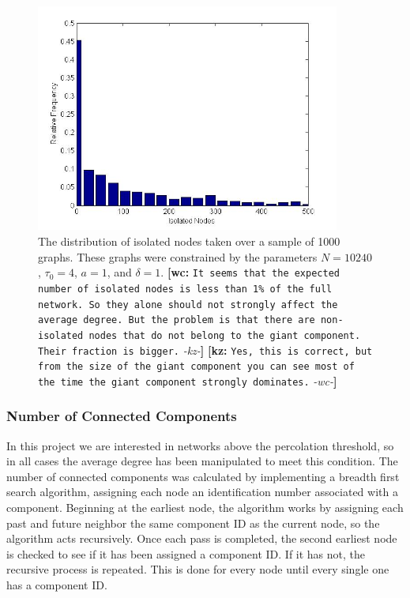 \documentclass[preprint,notitlepage,amsmath,amssymb,floatfix]{revtex4-1}
\newcommand{\XXX}[3]{{\bf [#1: } {\tt #3} {\it -#2-}{\bf ]}}
\begin{document}
\begin{figure}
\includegraphics[width=10cm]{figures/Isolated_Nodes.jpg}
\caption{The distribution of isolated nodes taken over a sample of 1000 graphs.  These graphs were constrained by the parameters $N = 10240$, $\tau_0 = 4$, $a = 1$, and $\delta = 1$. \XXX{wc}{kz}{It seems that the expected number of isolated nodes is less than 1\% of the full network. So they alone should not strongly affect the average degree. But the problem is that there are non-isolated nodes that do not belong to the giant component. Their fraction is bigger.} \XXX{kz}{wc}{Yes, this is correct, but from the size of the giant component you can see most of the time the giant component strongly dominates.}}
\label{fig:iso_nodes_uni}
\centering
\end{figure}

\subsubsection{Number of Connected Components}
In this project we are interested in networks above the percolation threshold, so in all cases the average degree has been manipulated to meet this condition.  
The number of connected components was calculated by implementing a breadth first search algorithm, assigning each node an identification number associated with a component.
Beginning at the earliest node, the algorithm works by assigning each past and future neighbor the same component ID as the current node, so the algorithm acts recursively.  Once each pass is completed, the second earliest node is checked to see if it has been assigned a component ID.  If it has not, the recursive process is repeated.  This is done for every node until every single one has a component ID.

\end{document}
